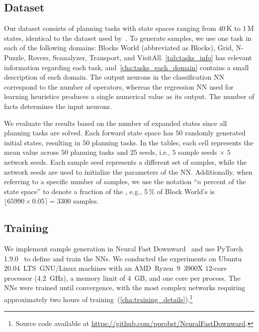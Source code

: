 \documentclass[ppgc,diss,english]{iiufrgs}
\begin{document}
\subsection{Dataset}
\label{sec:exp-dataset}
Our dataset consists of planning tasks with state spaces ranging from $40$\,K to $1$\,M states, identical to the dataset used by~\citet{Bettker.etal/2022}. To generate samples, we use one task in each of the following domains: Blocks World (abbreviated as Blocks), Grid, N-Puzzle, Rovers, Scanalyzer, Transport, and VisitAll. \cref{tab:tasks_info} has relevant information regarding each task, and~\vref{cha:tasks_each_domain} contains a small description of each domain. The output neurons in the classification NN correspond to the number of operators, whereas the regression NN used for learning heuristics produces a single numerical value as its output. The number of facts determines the input neurons.

We evaluate the results based on the number of expanded states since all planning tasks are solved. Each forward state space \fsp has $50$ randomly generated initial states, resulting in $50$ planning tasks. %
In the tables, each cell represents the mean value across $50$ planning tasks and $25$ seeds, i.e., $5$ sample seeds $\times$ $5$ network seeds. Each sample seed represents a different set of samples, while the network seeds are used to initialize the parameters of the NN.
Additionally, when referring to a specific number of samples, we use the notation ``$n$ percent of the state space'' to denote a fraction of the \fsp, e.g., $5\,\%$ of Block World's \fsp is $\lfloor 65990 \times 0.05 \rceil = 3300$ samples.



\subsection{Training}
\label{sec:exp-training}
We implement sample generation in Neural Fast Downward~\cite{Ferber.etal/2020a} and use PyTorch 1.9.0~\cite{Paszke/2019} to define and train the NNs. We conducted the experiments on Ubuntu~$20.04$~LTS~GNU/Linux machines with an AMD~Ryzen~$9$~$3900$X $12$-core processor ($4.2$~GHz), a memory limit of $4$~GB, and one core per process. The NNs were trained until convergence, with the most complex networks requiring approximately two hours of training~(\vref{cha:training_details}).\footnote{Source code available at \url{https://github.com/pprobst/NeuralFastDownward}.}
\end{document}
